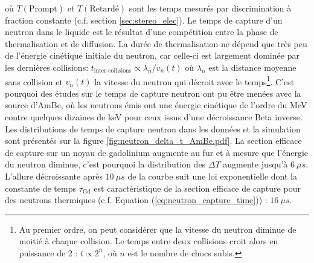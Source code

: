 où $T(\textrm{Prompt})$ et $T(\textrm{Retardé})$ sont les temps mesurés par discrimination à fraction constante (c.f. section \ref{sec:stereo_elec}). Le temps de capture d'un neutron dans le liquide est le résultat d'une compétition entre la phase de thermalisation et de diffusion. La durée de thermalisation ne dépend que très peu de l'énergie cinétique initiale du neutron, car celle-ci est largement dominée par les dernières collisions: $t_\textrm{inter-collisions} \propto \lambda_n / v_n(t)$ où $\lambda_n$ est la distance moyenne sans collision et $v_n(t)$ la vitesse du neutron qui décroit avec le temps\footnote{Au premier ordre, on peut considérer que la vitesse du neutron diminue de moitié à chaque collision. Le temps entre deux collisions croit alors en puissance de 2 : $t \propto 2^n$, où $n$ est le nombre de chocs subis.}. C'est pourquoi des études sur le temps de capture neutron ont pu être menées avec la source d'AmBe, où les neutrons émis ont une énergie cinétique de l'ordre du MeV contre quelques dizaines de keV pour ceux issus d'une décroissance Beta inverse. Les distributions de temps de capture neutron dans les données et la simulation sont présentés sur la figure \ref{fig:neutron_delta_t_AmBe.pdf}. La section efficace de capture sur un noyau de gadolinium augmente au fur et à mesure que l'énergie du neutron diminue, c'est pourquoi la distribution des $\Delta T$ augmente jusqu'à $\SI{6}{\mu s}$. L'allure décroissante après $\SI{10}{\mu s}$ de la courbe suit une loi exponentielle dont la constante de temps $\tau_\textrm{Gd}$ est caractéristique de la section efficace de capture pour des neutrons thermiques (c.f. Equation (\ref{eq:neutron_capture_time})) : $\SI{16}{\mu s}$.\\

